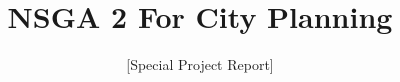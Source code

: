 \documentclass{sig-alternate}
\begin{document}
%

\title{NSGA 2 For City Planning}
\subtitle{[Special Project Report]}
%
%
%
%
%
\end{document}
